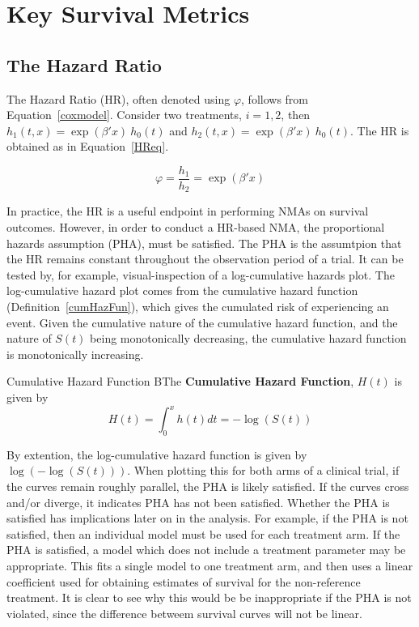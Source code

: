 \section{Key Survival Metrics}

\subsection{The Hazard Ratio}
The Hazard Ratio (HR), often denoted using $\varphi$, follows from Equation~\ref{coxmodel}. Consider two treatments, $i = 1, 2$, then $h_1(t, x) = \exp(\beta'x) \ h_0(t)$ and $h_2(t, x) = \exp(\beta'x) \ h_0(t)$. The HR is obtained as in Equation~\ref{HReq}.

\begin{equation}
    \varphi = \frac{h_1}{h_2} = \exp(\beta' x)
    \label{HReq}
\end{equation}

In practice, the HR is a useful endpoint in performing NMAs on survival outcomes. However, in order to conduct a HR-based NMA, the proportional hazards assumption (PHA), must be satisfied. The PHA is the assumtpion that the HR remains constant throughout the observation period of a trial. It can be tested by, for example, visual-inspection of a log-cumulative hazards plot. The log-cumulative hazard plot comes from the cumulative hazard function (Definition~\ref{cumHazFun}), which gives the cumulated risk of experiencing an event. Given the cumulative nature of the cumulative hazard function, and the nature of $S(t)$ being monotonically decreasing, the cumulative hazard function is monotonically increasing.

\begin{definition}{Cumulative Hazard Function}
    BThe \textbf{Cumulative Hazard Function}, $H(t)$ is given by 
    \begin{equation}
        H(t) = \int_{0}^{x}h(t)dt = -\log(S(t))  
    \end{equation}
    \label{cumHazFun}
\end{definition}

By extention, the log-cumulative hazard function is given by $\log(-\log(S(t)))$. When plotting this for both arms of a clinical trial, if the curves remain roughly parallel, the PHA is likely satisfied. If the curves cross and/or diverge, it indicates PHA has not been satisfied. Whether the PHA is satisfied has implications later on in the analysis. For example, if the PHA is not satisfied, then an individual model must be used for each treatment arm. If the PHA is satisfied, a model which does not include a treatment parameter may be appropriate. This fits a single model to one treatment arm, and then uses a linear coefficient used for obtaining estimates of survival for the non-reference treatment. It is clear to see why this would be be inappropriate if the PHA is not violated, since the difference betweem survival curves will not be linear. 

